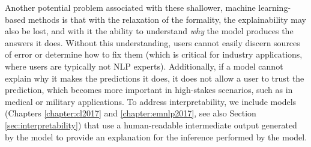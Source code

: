 Another potential problem associated with these shallower, machine learning-based methods is that with the relaxation of the formality, the explainability may also be lost, and with it the ability to understand \emph{why} the model produces the answers it does.  
Without this understanding, users cannot easily discern sources of error or determine how to fix them (which is critical for industry applications, where users are typically not NLP experts).  Additionally, if a model cannot explain why it makes the predictions it does, it does not allow a user to trust the prediction, which becomes more important in high-stakes scenarios, such as in medical or military applications. 
To address interpretability, we include models (Chapters \ref{chapter:cl2017} and \ref{chapter:emnlp2017}, see also Section \ref{sec:interpretability}) that use a human-readable intermediate output generated by the model to provide an explanation for the inference performed by the model.





